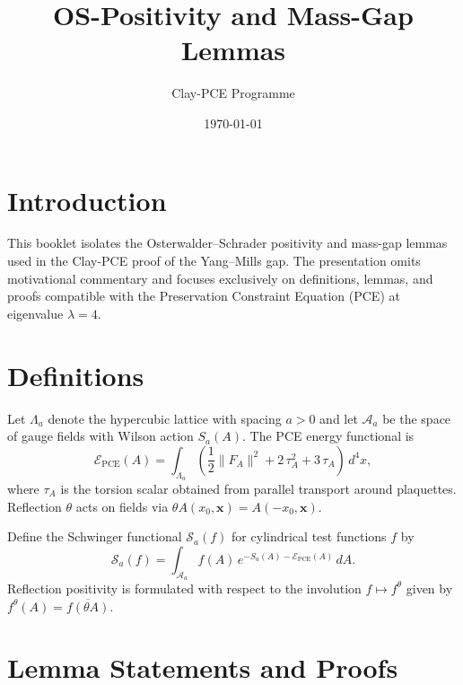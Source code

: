 \documentclass[11pt]{article}
\title{OS-Positivity and Mass-Gap Lemmas}
\author{Clay-PCE Programme}
\date{\today}
\begin{document}
\maketitle

\section*{Introduction}
This booklet isolates the Osterwalder--Schrader positivity and mass-gap lemmas used in the Clay-PCE proof of the Yang--Mills gap. The presentation omits motivational commentary and focuses exclusively on definitions, lemmas, and proofs compatible with the Preservation Constraint Equation (PCE) at eigenvalue $\lambda = 4$.

\section{Definitions}
Let $\Lambda_a$ denote the hypercubic lattice with spacing $a>0$ and let $\mathcal{A}_a$ be the space of gauge fields with Wilson action $S_a(A)$. The PCE energy functional is
\begin{equation}
\mathcal{E}_{\text{PCE}}(A) = \int_{\Lambda_a} \left( \frac{1}{2} \|F_A\|^2 + 2\,\tau_A^2 + 3\,\tau_A \right) \, d^4x,
\end{equation}
where $\tau_A$ is the torsion scalar obtained from parallel transport around plaquettes. Reflection $\theta$ acts on fields via $\theta A(x_0, \mathbf{x}) = A(-x_0, \mathbf{x})$.

Define the Schwinger functional $\mathcal{S}_a(f)$ for cylindrical test functions $f$ by
\begin{equation}
\mathcal{S}_a(f) = \int_{\mathcal{A}_a} f(A) \, e^{-S_a(A) - \mathcal{E}_{\text{PCE}}(A)} \, dA.
\end{equation}
Reflection positivity is formulated with respect to the involution $f \mapsto f^\theta$ given by $f^\theta(A) = \overline{f(\theta A)}$.

\section{Lemma Statements and Proofs}
\end{document}
